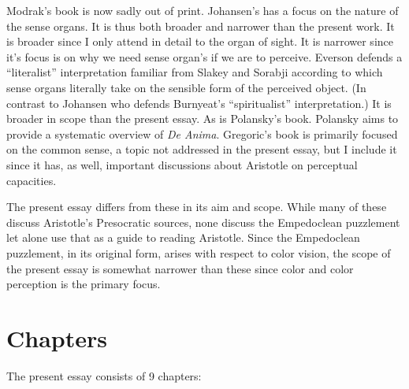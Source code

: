 \documentclass[12pt]{article}
\begin{document}
Modrak's book is now sadly out of print. Johansen's has a focus on the nature of the sense organs. It is thus both broader and narrower than the present work. It is broader since I only attend in detail to the organ of sight. It is narrower since it's focus is on why we need sense organ's if we are to perceive. Everson defends a ``literalist'' interpretation familiar from Slakey and Sorabji according to which sense organs literally take on the sensible form of the perceived object. (In contrast to Johansen who defends Burnyeat's ``spiritualist'' interpretation.) It is broader in scope than the present essay. As is Polansky's book. Polansky aims to provide a systematic overview of \emph{De Anima}. Gregoric's book is primarily focused on the common sense, a topic not addressed in the present essay, but I include it since it has, as well, important discussions about Aristotle on perceptual capacities.

The present essay differs from these in its aim and scope. While many of these discuss Aristotle's Presocratic sources, none discuss the Empedoclean puzzlement let alone use that as a guide to reading Aristotle. Since the Empedoclean puzzlement, in its original form, arises with respect to color vision, the scope of the present essay is somewhat narrower than these since color and color perception is the primary focus.


\section{Chapters} %
\label{sec:chapters}

The present essay consists of 9 chapters:
\end{document}

